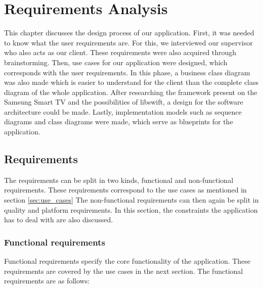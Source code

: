 \chapter{Requirements Analysis}
\label{sec:requirements}
This chapter discusses the design process of our application. First, it was needed to know what the user requirements are.
For this, we interviewed our supervisor who also acts as our client. These requirements were also acquired through brainstorming.
Then, use cases for our application were designed, which corresponds with the user requirements.
In this phase, a business class diagram was also made which is easier to understand for the client than the complete class diagram of the whole application. 
After researching the framework present on the Samsung Smart TV and the possibilities of libswift, a design for the software architecture could be made. 
Lastly, implementation models such as sequence diagrams and class diagrams were made, which serve as blueprints for the application.

\section{Requirements}
The requirements can be split in two kinds, functional and non-functional requirements. These requirements  correspond to the use cases as mentioned in section \hyperref[sec:use_cases]{\ref*{sec:use_cases}} The non-functional requirements can then again be split in quality and platform requirements. In this section, the constraints the application has to deal with are also discussed.

\subsection{Functional requirements}
Functional requirements specify the core functionality of the application. These requirements are covered by the use cases in the next section. The functional requirements are as follows:

